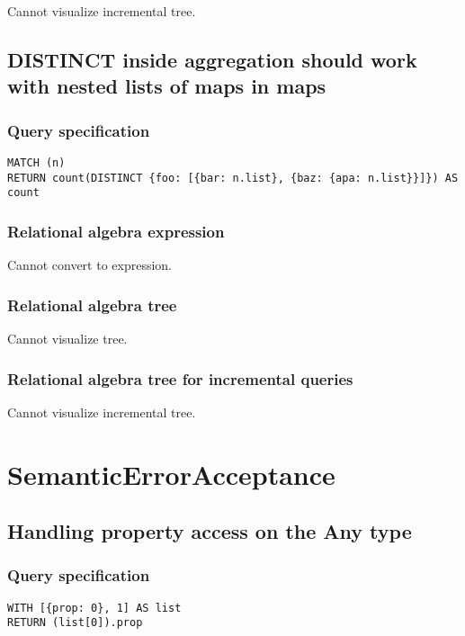 Cannot visualize incremental tree.

\subsection{DISTINCT inside aggregation should work with nested lists of maps in maps}

\subsubsection*{Query specification}

\begin{lstlisting}
MATCH (n)
RETURN count(DISTINCT {foo: [{bar: n.list}, {baz: {apa: n.list}}]}) AS count
\end{lstlisting}

\subsubsection*{Relational algebra expression}

Cannot convert to expression.

\subsubsection*{Relational algebra tree}

Cannot visualize tree.

\subsubsection*{Relational algebra tree for incremental queries}

Cannot visualize incremental tree.

\section{SemanticErrorAcceptance}

\subsection{Handling property access on the Any type}

\subsubsection*{Query specification}

\begin{lstlisting}
WITH [{prop: 0}, 1] AS list
RETURN (list[0]).prop
\end{lstlisting}

